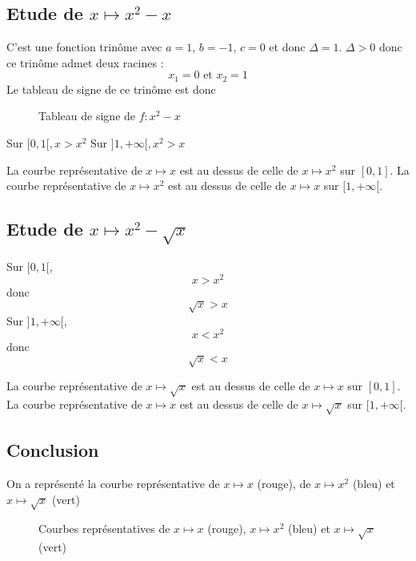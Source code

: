 \subsection{Etude de $x\mapsto x^2 - x$}
C'est une fonction trinôme avec $a = 1$, $b = -1$, $c = 0$ et donc $\Delta = 1$. $\Delta > 0$ donc ce trinôme admet deux racines :
$$x_1 = 0 \text{ et } x_2=1$$
Le tableau de signe de ce trinôme est donc\newline
\begin{figure}[H]
\centering
{}\newline
\caption{Tableau de signe de $f:x^2-x$}
\end{figure}

Sur $[0,1[, x > x^2$\newline
Sur $]1,+\infty[, x^2 > x$\newline

La courbe représentative de $x\mapsto x$ est au dessus de celle de $x\mapsto x^2$ sur $[0,1]$. La courbe représentative de $x\mapsto x^2$ est au dessus de celle de $x\mapsto x$ sur $[1,+\infty[$.
\subsection{Etude de $x \mapsto x^2 - \sqrt{x}$}
Sur $[0,1[$, \newline 
$$x > x^2$$
donc 
$$\sqrt{x} > x$$
Sur $]1,+\infty[$, \newline 
$$x < x^2$$
donc 
$$\sqrt{x} < x$$

La courbe représentative de $x\mapsto \sqrt{x}$ est au dessus de celle de $x\mapsto x$ sur $[0,1]$. La courbe représentative de $x\mapsto x$ est au dessus de celle de $x\mapsto \sqrt{x}$ sur $[1,+\infty[$.

\subsection{Conclusion}
On a représenté la courbe représentative de $x\mapsto x$ (rouge), de $x\mapsto x^2$ (bleu) et $x \mapsto \sqrt{x}$ (vert) \newline
\begin{figure}[H]
\centering
{}
\caption{Courbes représentatives de $x\mapsto x$ (rouge), $x\mapsto x^2$ (bleu) et $x\mapsto \sqrt{x}$ (vert)}
\end{figure}
